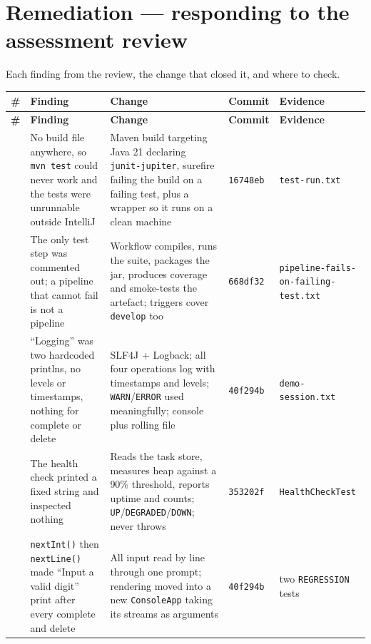 \documentclass[11pt,a4paper]{article}
\newcommand{\code}[1]{\texttt{\small #1}}
\begin{document}
\section{Remediation --- responding to the assessment review}
\label{sec:remediation}

Each finding from the review, the change that closed it, and where to check.

\begin{longtable}{@{}c L{4.5cm} L{5.3cm} l L{2.7cm}@{}}
\toprule
\textbf{\#} & \textbf{Finding} & \textbf{Change} & \textbf{Commit} & \textbf{Evidence} \\
\midrule
\endfirsthead
\toprule
\textbf{\#} & \textbf{Finding} & \textbf{Change} & \textbf{Commit} & \textbf{Evidence} \\
\midrule
\endhead
\bottomrule
{} & No build file anywhere, so \code{mvn test} could never work and the tests were unrunnable outside IntelliJ & Maven build targeting Java 21 declaring \code{junit-jupiter}, surefire failing the build on a failing test, plus a wrapper so it runs on a clean machine & \code{16748eb} & \code{test-run.txt} \\
 & The only test step was commented out; a pipeline that cannot fail is not a pipeline & Workflow compiles, runs the suite, packages the jar, produces coverage and smoke-tests the artefact; triggers cover \code{develop} too & \code{668df32} & \code{pipeline-fails-\allowbreak on-failing-test.txt} \\
 & ``Logging'' was two hardcoded printlns, no levels or timestamps, nothing for complete or delete & SLF4J + Logback; all four operations log with timestamps and levels; \code{WARN}/\code{ERROR} used meaningfully; console plus rolling file & \code{40f294b} & \code{demo-session.txt} \\
 & The health check printed a fixed string and inspected nothing & Reads the task store, measures heap against a 90\% threshold, reports uptime and counts; \code{UP}/\code{DEGRADED}/\code{DOWN}; never throws & \code{353202f} & \code{HealthCheckTest} \\
 & \code{nextInt()} then \code{nextLine()} made ``Input a valid digit'' print after every complete and delete & All input read by line through one prompt; rendering moved into a new \code{ConsoleApp} taking its streams as arguments & \code{40f294b} & two \code{REGRESSION} tests \\

\end{longtable}
\end{document}

